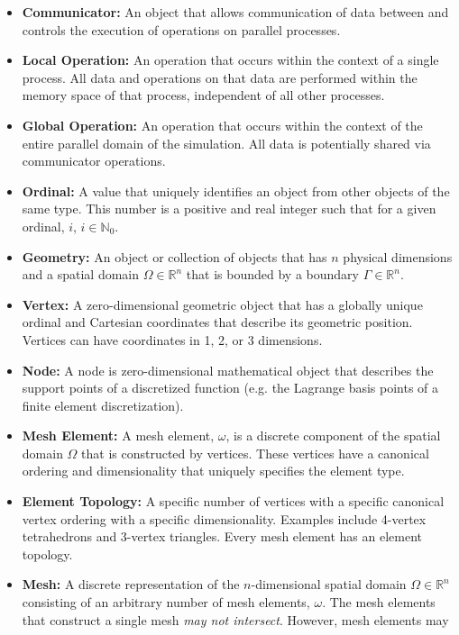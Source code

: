\documentclass[letterpaper,12pt]{article}
\begin{document}
\begin{itemize}
\item {\bf Communicator:} An object that allows communication of data
  between and controls the execution of operations on parallel
  processes.
\item {\bf Local Operation:} An operation that occurs within the
  context of a single process. All data and operations on that data
  are performed within the memory space of that process, independent
  of all other processes.
\item {\bf Global Operation:} An operation that occurs within the
  context of the entire parallel domain of the simulation. All data is
  potentially shared via communicator operations.
\item {\bf Ordinal:} A value that uniquely identifies an object from
  other objects of the same type. This number is a positive and real
  integer such that for a given ordinal, $i$, $i \in
  \mathbb{N}_0$.
\item {\bf Geometry:} An object or collection of objects that has $n$
  physical dimensions and a spatial domain $\Omega \in \mathbb{R}^n$
  that is bounded by a boundary $\Gamma \in \mathbb{R}^n$.
\item {\bf Vertex:} A zero-dimensional geometric object that has a
  globally unique ordinal and Cartesian coordinates that describe its
  geometric position. Vertices can have coordinates in 1, 2, or 3
  dimensions.
\item {\bf Node:} A node is zero-dimensional mathematical object that
  describes the support points of a discretized function (e.g. the
  Lagrange basis points of a finite element discretization).
\item {\bf Mesh Element:} A mesh element, $\omega$, is a discrete
  component of the spatial domain $\Omega$ that is constructed by
  vertices. These vertices have a canonical ordering and
  dimensionality that uniquely specifies the element type.
\item {\bf Element Topology:} A specific number of vertices with a
  specific canonical vertex ordering with a specific
  dimensionality. Examples include 4-vertex tetrahedrons and 3-vertex
  triangles. Every mesh element has an element topology.
\item {\bf Mesh:} A discrete representation of the $n$-dimensional
  spatial domain $\Omega \in \mathbb{R}^n$ consisting of an arbitrary
  number of mesh elements, $\omega$. The mesh elements that construct
  a single mesh {\sl may not intersect}. However, mesh elements may

\end{itemize}
\end{document}
